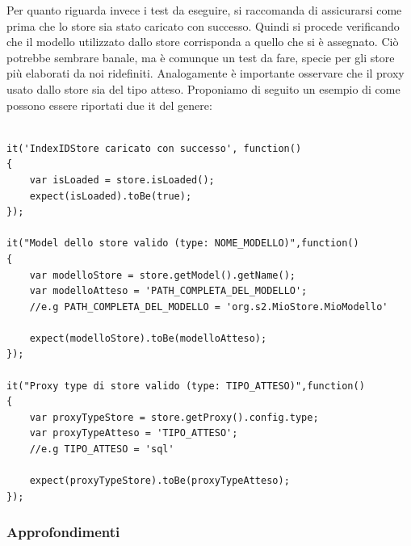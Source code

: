 \documentclass[10pt,a4paper,onecolumn]{article}
\begin{document}
Per quanto riguarda invece i test da eseguire, si raccomanda di assicurarsi come prima che lo store sia stato caricato con successo. Quindi si procede verificando che il modello utilizzato dallo store corrisponda a quello che si è assegnato. Ciò potrebbe sembrare banale, ma è comunque un test da fare, specie per gli store più elaborati da noi ridefiniti. Analogamente è importante osservare che il proxy usato dallo store sia del tipo atteso. Proponiamo di seguito un esempio di come possono essere riportati due it del genere:

\begin{lstlisting}

it('IndexIDStore caricato con successo', function()
{
	var isLoaded = store.isLoaded();
	expect(isLoaded).toBe(true);
});
 
it("Model dello store valido (type: NOME_MODELLO)",function()
{	
	var modelloStore = store.getModel().getName();
	var modelloAtteso = 'PATH_COMPLETA_DEL_MODELLO';
	//e.g PATH_COMPLETA_DEL_MODELLO = 'org.s2.MioStore.MioModello'
	
	expect(modelloStore).toBe(modelloAtteso);
});

it("Proxy type di store valido (type: TIPO_ATTESO)",function()
{	
	var proxyTypeStore = store.getProxy().config.type;
	var proxyTypeAtteso = 'TIPO_ATTESO';
	//e.g TIPO_ATTESO = 'sql'

	expect(proxyTypeStore).toBe(proxyTypeAtteso);
});

\end{lstlisting}

\subsubsection{Approfondimenti}
\end{document}
